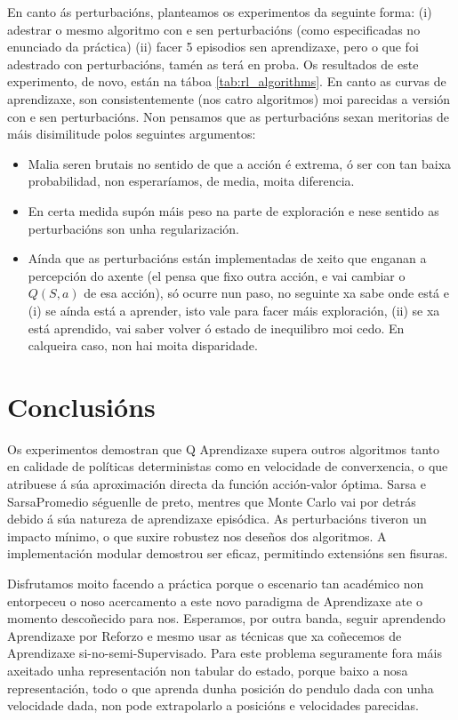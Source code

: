 \documentclass{article}
\begin{document}
En canto ás perturbacións, planteamos os experimentos da seguinte forma: (i) adestrar o mesmo algoritmo con e sen perturbacións (como especificadas no enunciado da práctica) (ii) facer 5 episodios sen aprendizaxe, pero o que foi adestrado con perturbacións, tamén as terá en proba. Os resultados de este experimento, de novo, están na táboa \ref{tab:rl_algorithms}. En canto as curvas de aprendizaxe, son consistentemente (nos catro algoritmos) moi parecidas a versión con e sen perturbacións. Non pensamos que as perturbacións sexan meritorias de máis disimilitude polos seguintes argumentos:
\begin{itemize}
	\item Malia seren brutais no sentido de que a acción é extrema, ó ser con tan baixa probabilidad, non esperaríamos, de media, moita diferencia.
	\item En certa medida supón máis peso na parte de exploración e nese sentido as perturbacións son unha regularización.
	\item Aínda que as perturbacións están implementadas de xeito que enganan a percepción do axente (el pensa que fixo outra acción, e vai cambiar o $Q(S,a)$ de esa acción), só ocurre nun paso, no seguinte xa sabe onde está e (i) se aínda está a aprender, isto vale para facer máis exploración, (ii) se xa está aprendido, vai saber volver ó estado de inequilibro moi cedo. En calqueira caso, non hai moita disparidade. 

\end{itemize}

\section{Conclusións}

Os experimentos demostran que Q Aprendizaxe supera outros algoritmos tanto en calidade de políticas deterministas como en velocidade de converxencia, o que atribuese á súa aproximación directa da función acción-valor óptima. Sarsa e SarsaPromedio séguenlle de preto, mentres que Monte Carlo vai por detrás debido á súa natureza de aprendizaxe episódica. As perturbacións tiveron un impacto mínimo, o que suxire robustez nos deseños dos algoritmos. A implementación modular demostrou ser eficaz, permitindo extensións sen fisuras. 

Disfrutamos moito facendo a práctica porque o escenario tan académico non entorpeceu o noso acercamento a este novo paradigma de Aprendizaxe ate o momento descoñecido para nos. Esperamos, por outra banda, seguir aprendendo Aprendizaxe por Reforzo e mesmo usar as técnicas que xa coñecemos de Aprendizaxe si-no-semi-Supervisado. Para este problema seguramente fora máis axeitado unha representación non tabular do estado, porque baixo a nosa representación, todo o que aprenda dunha posición do pendulo dada con unha velocidade dada, non pode extrapolarlo a posicións e velocidades parecidas. 
\end{document}
